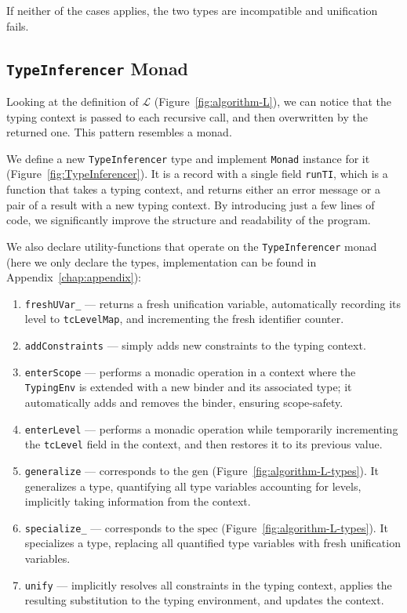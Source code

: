If neither of the cases applies, the two types are incompatible and unification fails.

\subsection{\texttt{TypeInferencer} Monad}

Looking at the definition of $\mathcal{L}$ (Figure~\ref{fig:algorithm-L}), we can notice that the typing context is passed to each recursive call, and then overwritten by the returned one. This pattern resembles a monad.

We define a new \texttt{TypeInferencer} type and implement \texttt{Monad} instance for it (Figure~\ref{fig:TypeInferencer}). It is a record with a single field \texttt{runTI}, which is a function that takes a typing context, and returns either an error message or a pair of a result with a new typing context. By introducing just a few lines of code, we significantly improve the structure and readability of the program.

We also declare utility-functions that operate on the \texttt{TypeInferencer} monad (here we only declare the types, implementation can be found in Appendix~\ref{chap:appendix}):

\begin{enumerate}
  \item \texttt{freshUVar\_} — returns a fresh unification variable, automatically recording its level to \texttt{tcLevelMap}, and incrementing the fresh identifier counter.
  \item \texttt{addConstraints} — simply adds new constraints to the typing context.
  \item \texttt{enterScope} — performs a monadic operation in a context where the \texttt{TypingEnv} is extended with a new binder and its associated type; it automatically adds and removes the binder, ensuring scope-safety.
  \item \texttt{enterLevel} — performs a monadic operation while temporarily incrementing the \texttt{tcLevel} field in the context, and then restores it to its previous value.
  \item \texttt{generalize} — corresponds to the $\mathrm{gen}$ (Figure~\ref{fig:algorithm-L-types}). It generalizes a type, quantifying all type variables accounting for levels, implicitly taking information from the context.
  \item \texttt{specialize\_} — corresponds to the $\mathrm{spec}$ (Figure~\ref{fig:algorithm-L-types}). It specializes a type, replacing all quantified type variables with fresh unification variables.
  \item \texttt{unify} — implicitly resolves all constraints in the typing context, applies the resulting substitution to the typing environment, and updates the context.
\end{enumerate}

